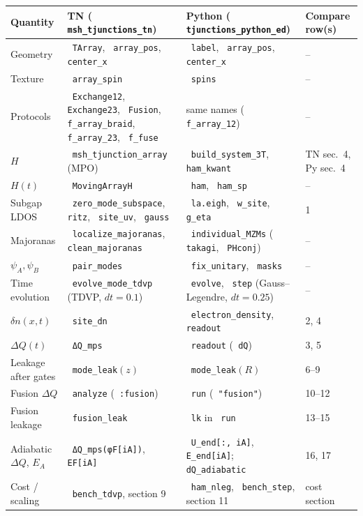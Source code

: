 \documentclass[11pt]{article}
\renewcommand{\code}[1]{\texttt{\hyphenchar\font=-1 #1}}
\begin{document}
\begin{center}
\small
\begin{tabularx}{\textwidth}{>{\raggedright}p{3.0cm}>{\raggedright}p{4.3cm}>{\raggedright}p{4.3cm}X}
\toprule
Quantity & TN (\code{msh\_tjunctions\_tn}) & Python (\code{tjunctions\_python\_ed}) & Compare row(s)\\
\midrule
Geometry & \code{TArray}, \code{array\_pos}, \code{center\_x} & \code{label}, \code{array\_pos}, \code{center\_x} & --\\
Texture & \code{array\_spin} & \code{spins} & --\\
Protocols & \code{Exchange12}, \code{Exchange23}, \code{Fusion}, \code{f\_array\_braid}, \code{f\_array\_23}, \code{f\_fuse} & same names (\code{f\_array\_12}) & --\\
$H$ & \code{msh\_tjunction\_array} (MPO) & \code{build\_system\_3T}, \code{ham\_kwant} & TN sec.~4, Py sec.~4\\
$H(t)$ & \code{MovingArrayH} & \code{ham}, \code{ham\_sp} & --\\
Subgap LDOS & \code{zero\_mode\_subspace}, \code{ritz}, \code{site\_uv}, \code{gauss} & \code{la.eigh}, \code{w\_site}, \code{g\_eta} & 1\\
Majoranas & \code{localize\_majoranas}, \code{clean\_majoranas} & \code{individual\_MZMs} (\code{takagi}, \code{PHconj}) & --\\
$\psi_A,\psi_B$ & \code{pair\_modes} & \code{fix\_unitary}, \code{masks} & --\\
Time evolution & \code{evolve\_mode\_tdvp} (TDVP, $dt=0.1$) & \code{evolve}, \code{step} (Gauss--Legendre, $dt = 0.25$) & --\\
$\delta n(x,t)$ & \code{site\_dn} & \code{electron\_density}, \code{readout} & 2, 4\\
$\Delta Q(t)$ & \code{ΔQ\_mps} & \code{readout} (\code{dQ}) & 3, 5\\
Leakage after gates & \code{mode\_leak}$(z)$ & \code{mode\_leak}$(R)$ & 6--9\\
Fusion $\Delta Q$ & \code{analyze} (\code{:fusion}) & \code{run} (\code{"fusion"}) & 10--12\\
Fusion leakage & \code{fusion\_leak} & \code{lk} in \code{run} & 13--15\\
Adiabatic $\Delta Q$, $E_A$ & \code{ΔQ\_mps(φF[iA])}, \code{EF[iA]} & \code{U\_end[:, iA]}, \code{E\_end[iA]}; \code{dQ\_adiabatic} & 16, 17\\
Cost / scaling & \code{bench\_tdvp}, section 9 & \code{ham\_nleg}, \code{bench\_step}, section 11 & cost section\\
\bottomrule
\end{tabularx}
\end{center}

\clearpage

\clearpage

\clearpage

\end{document}
